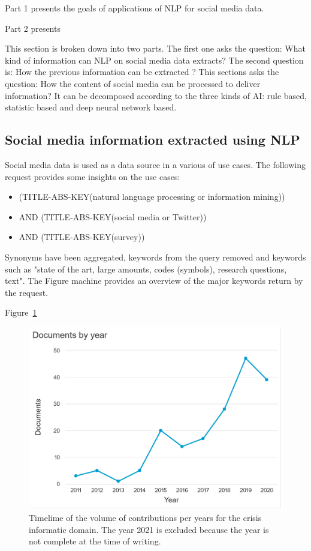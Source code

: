 Part 1 presents the goals of applications of NLP for social media data.

Part 2 presents

This section is broken down into two parts.
The first one asks the question: What kind of information can NLP on social media data extracts?
The second question is: How the previous information can be extracted ?
This sections asks the question: How the content of social media can be processed to deliver information?
It can be decomposed according to the three kinds of AI: rule based, statistic based and deep neural network based.

\subsection{Social media information extracted using NLP}
Social media data is used as a data source in a various of use cases.
The following request provides some insights on the use cases:
\begin{itemize}
    \item (TITLE-ABS-KEY({natural language processing} or {information mining}))
    \item AND (TITLE-ABS-KEY({social media} or Twitter))
    \item AND (TITLE-ABS-KEY(survey))
\end{itemize}
Synonyms have been aggregated, keywords from the query removed and keywords such as "state of the art, large amounts, codes (symbols), research questions, text".
The Figure machine provides an overview of the major keywords return by the request.

Figure~\ref{literature:nlp-hist}

\begin{figure}[bp]
    \centering
    \includegraphics[width=\textwidth]{figures/chap-2/nlp-hist.pdf}
    \caption{Timelime of the volume of contributions per years for the crisis informatic domain. The year 2021 is excluded because the year is not complete at the time of writing.}
    \label{literature:nlp-hist}
\end{figure}


